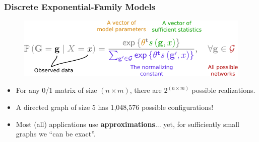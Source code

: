 \documentclass[aspectratio=169, 9pt, handout]{beamer}
\begin{document}
\begin{frame}[t,label=discrete-exponential]
	
	\frametitle{Discrete Exponential-Family Models}
	
	\begin{figure}
		\includegraphics[width=.7\linewidth]{parts-of-ergm.pdf}
	\end{figure}\pause
	
	\vfill
		
	\begin{itemize}
		\item For any 0/1 matrix of size $(n\times m)$, there are $2^{(n\times m)}$ possible realizations.\pause
		\item A directed graph of size 5 has 1,048,576 possible configurations!\pause
		\item Most (all) applications use \textbf{approximations}...\pause{} yet, for sufficiently small graphs we ``can be exact''.
	\end{itemize}
	
	\vfill\hfill\hyperlink{discrete-exponential-theory}{} %
	
\end{frame}
\end{document}
